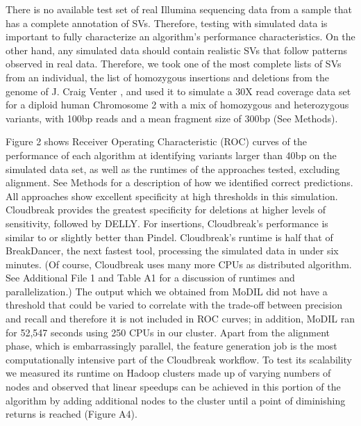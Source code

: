 \documentclass[10pt]{bmc_article}
\newenvironment{bmcformat}{\fussy\setboolean{publ}{true}}{\fussy}
\begin{document}
\begin{bmcformat}
There is no available test set of real Illumina sequencing data from a sample that has a complete annotation of SVs. Therefore, testing with simulated data is important to fully characterize an algorithm's performance characteristics. On the other hand, any simulated data should contain realistic SVs that follow patterns observed in real data. Therefore, we took one of the most complete lists of SVs from an individual, the list of homozygous insertions and deletions from the genome of J. Craig Venter \cite{Levy:2007fb}, and used it to simulate a 30X read coverage data set for a diploid human Chromosome 2 with a mix of homozygous and heterozygous variants, with 100bp reads and a mean fragment size of 300bp (See Methods).

Figure 2 shows Receiver Operating Characteristic (ROC) curves of the performance of each algorithm at identifying variants larger than 40bp on the simulated data set, as well as the runtimes of the approaches tested, excluding alignment. See Methods for a description of how we identified correct predictions. All approaches show excellent specificity at high thresholds in this simulation. Cloudbreak provides the greatest specificity for deletions at higher levels of sensitivity, followed by DELLY. For insertions, Cloudbreak's performance is similar to or slightly better than Pindel. Cloudbreak's runtime is half that of BreakDancer, the next fastest tool, processing the simulated data in under six minutes. (Of course, Cloudbreak uses many more CPUs as distributed algorithm. See Additional File 1 and Table A1 for a discussion of runtimes and parallelization.) The output which we obtained from MoDIL did not have a threshold that could be varied to correlate with the trade-off between precision and recall and therefore it is not included in ROC curves; in addition, MoDIL ran for 52,547 seconds using 250 CPUs in our cluster. Apart from the alignment phase, which is embarrassingly parallel, the feature generation job is the most computationally intensive part of the Cloudbreak workflow. To test its scalability we measured its runtime on Hadoop clusters made up of varying numbers of nodes and observed that linear speedups can be achieved in this portion of the algorithm by adding additional nodes to the cluster until a point of diminishing returns is reached (Figure A4).


\end{bmcformat}
\end{document}
